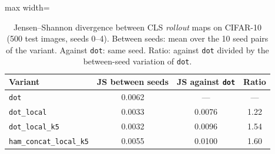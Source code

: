 \begin{table}[tbp]
\centering
\small
\caption{Jensen--Shannon divergence between CLS \emph{rollout} maps on CIFAR-10 (500 test images, seeds 0--4). Between seeds: mean over the 10 seed pairs of the variant. Against \texttt{dot}: same seed. Ratio: against \texttt{dot} divided by the between-seed variation of \texttt{dot}.}
\label{tab:mapas}
\begin{adjustbox}{max width=\columnwidth}
\begin{tabular}{lccc}
\toprule
Variant & JS between seeds & JS against \texttt{dot} & Ratio \\
\midrule
\texttt{dot} & 0.0062 & --- & --- \\
\texttt{dot\_local} & 0.0033 & 0.0076 & 1.22 \\
\texttt{dot\_local\_k5} & 0.0032 & 0.0096 & 1.54 \\
\texttt{ham\_concat\_local\_k5} & 0.0055 & 0.0100 & 1.60 \\
\bottomrule
\end{tabular}
\end{adjustbox}
\end{table}
